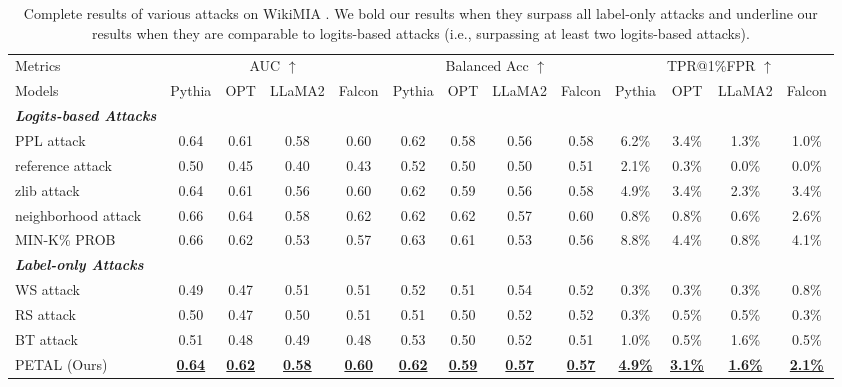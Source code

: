 \begin{table*}[!t]
\centering
\setlength{\tabcolsep}{3pt}
\caption{Complete results of various attacks on WikiMIA \cite{shi2023detecting}. We bold our results when they surpass all label-only attacks and underline our results when they are comparable to logits-based attacks (i.e., surpassing at least two logits-based attacks).}
\vspace{-2mm}
\scalebox{0.95}
{
\begin{tabular}{l|cccccccccccc}
\toprule  
Metrics & \multicolumn{4}{c}{AUC $\uparrow$}&  \multicolumn{4}{c}{Balanced Acc $\uparrow$}& \multicolumn{4}{c}{TPR@1\%FPR  $\uparrow$}\\
\cmidrule(l{5pt}r{5pt}){2-5}\cmidrule(l{5pt}r{5pt}){6-9}\cmidrule(l{5pt}r{5pt}){10-13}
Models & Pythia& OPT& LLaMA2& Falcon&Pythia& OPT& LLaMA2& Falcon& Pythia& OPT& LLaMA2& Falcon\\
\midrule
\textbf{\textit{Logits-based Attacks}}&&&&&&&&&&&&\\
PPL attack              &0.64&0.61&0.58&0.60&0.62&0.58&0.56&0.58&6.2\%&3.4\%&1.3\%&1.0\%\\
reference attack        &0.50&0.45&0.40&0.43&0.52&0.50&0.50&0.51&2.1\%&0.3\%&0.0\%&0.0\%\\
zlib attack             &0.64&0.61&0.56&0.60&0.62&0.59&0.56&0.58&4.9\%&3.4\%&2.3\%&3.4\%\\
neighborhood attack     &0.66&0.64&0.58&0.62&0.62&0.62&0.57&0.60&0.8\%&0.8\%&0.6\%&2.6\%\\
MIN-K\% PROB            &0.66&0.62&0.53&0.57&0.63&0.61&0.53&0.56&8.8\%&4.4\%&0.8\%&4.1\%\\
\midrule
\textbf{\textit{Label-only Attacks}}&&&&&&&&&&&&\\
WS attack               &0.49&0.47&0.51&0.51&0.52&0.51&0.54&0.52&0.3\%&0.3\%&0.3\%&0.8\%\\
RS attack               &0.50&0.47&0.50&0.51&0.51&0.50&0.52&0.52&0.3\%&0.5\%&0.5\%&0.3\%\\
BT attack               &0.51&0.48&0.49&0.48&0.53&0.50&0.52&0.51&1.0\%&0.5\%&1.6\%&0.5\%\\
PETAL (Ours)&\textbf{\ul{0.64}}&\textbf{\ul{0.62}}&\textbf{\ul{0.58}}&\textbf{\ul{0.60}}&\textbf{\ul{0.62}}&\textbf{\ul{0.59}}&\textbf{\ul{0.57}}&\textbf{\ul{0.57}}&\textbf{\ul{4.9\%}}&\textbf{\ul{3.1\%}}&\textbf{\ul{1.6\%}}&\textbf{\ul{2.1\%}}\\
\bottomrule
\end{tabular}
}
\vspace{-0.1em}
\label{table:main results on WikiMIA}
\end{table*}